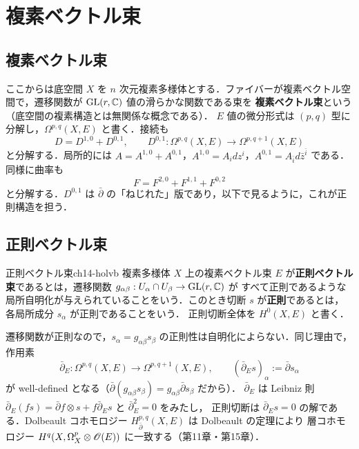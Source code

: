 \section{複素ベクトル束}

\subsection{複素ベクトル束}

ここからは底空間 $X$ を $n$ 次元複素多様体とする．ファイバーが複素ベクトル空間で，遷移関数が $\operatorname{GL}(r,\mathbb{C})$ 値の滑らかな関数である束を
\textbf{複素ベクトル束}という（底空間の複素構造とは無関係な概念である）．
$E$ 値の微分形式は $(p,q)$ 型に分解し，$\Omega^{p,q}(X,E)$ と書く．接続も
\begin{equation}
  D = D^{1,0} + D^{0,1},\qquad D^{0,1}:\Omega^{p,q}(X,E)\to\Omega^{p,q+1}(X,E)
\end{equation}
と分解する．局所的には $A = A^{1,0}+A^{0,1}$，$A^{1,0}=A_i dz^i$，$A^{0,1}=A_{\bar i}d\bar z^{\bar i}$ である．
同様に曲率も
\begin{equation}
  F = F^{2,0} + F^{1,1} + F^{0,2}
\end{equation}
と分解する．$D^{0,1}$ は $\bar\partial$ の「ねじれた」版であり，以下で見るように，これが正則構造を担う．

\subsection{正則ベクトル束}

\begin{mydef}{正則ベクトル束}{ch14-holvb}
複素多様体 $X$ 上の複素ベクトル束 $E$ が\textbf{正則ベクトル束}であるとは，遷移関数 $g_{\alpha\beta}:U_\alpha\cap U_\beta\to\operatorname{GL}(r,\mathbb{C})$ が
すべて正則であるような局所自明化が与えられていることをいう．このとき切断 $s$ が\textbf{正則}であるとは，各局所成分 $s_\alpha$ が正則であることをいう．
正則切断全体を $H^0(X,E)$ と書く．
\end{mydef}

遷移関数が正則なので，$s_\alpha=g_{\alpha\beta}s_\beta$ の正則性は自明化によらない．同じ理由で，作用素
\begin{equation}
  \bar\partial_E:\Omega^{p,q}(X,E)\to\Omega^{p,q+1}(X,E),\qquad (\bar\partial_E s)_\alpha := \bar\partial s_\alpha
\end{equation}
が well-defined となる（$\bar\partial(g_{\alpha\beta}s_\beta) = g_{\alpha\beta}\bar\partial s_\beta$ だから）．
$\bar\partial_E$ は Leibniz 則 $\bar\partial_E(fs)=\bar\partial f\otimes s + f\bar\partial_E s$ と $\bar\partial_E^2=0$ をみたし，
正則切断は $\bar\partial_E s=0$ の解である．Dolbeault コホモロジー $H^{p,q}_{\bar\partial}(X,E)$ は Dolbeault の定理により
層コホモロジー $H^q(X,\Omega^p_X\otimes\mathscr{O}(E))$ に一致する（第11章・第15章）．


